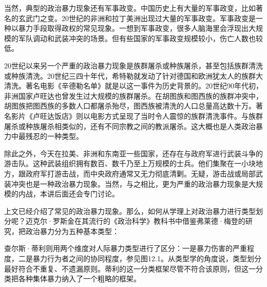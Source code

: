 当然，典型的政治暴力现象还有军事政变。中国历史上有大量的军事政变，比如著名的玄武门之变。20世纪的非洲和拉丁美洲出现过大量的军事政变。军事政变是一种以暴力手段取得政权的常见现象。一想到军事政变，很多人脑海里会浮现出大规模的军队调动和武装冲突的场景。但有些国家的军事政变规模较小，伤亡人数也较低。

20世纪以来另一个严重的政治暴力现象是族群屠杀或种族屠杀，甚至包括族群清洗或种族清洗。20世纪三四十年代，希特勒就发动了针对德国和欧洲犹太人的族群大清洗。著名电影《辛德勒名单》就是以这一事件为历史背景的。20世纪90年代初，非洲国家卢旺达也曾发生过大规模的族群屠杀。在胡图族和图西族的族群冲突中，胡图族把图西族的多数人口都屠杀殆尽，图西族被清洗的人口总量高达数十万。著名影片《卢旺达饭店》则以电影方式呈现了当时令人震惊的族群清洗事件。与族群屠杀或种族屠杀相类似的，还有不同宗教之间的教派屠杀。这大概也是人类政治暴力中最残忍的一种类型。

除此之外，今天在拉美、非洲和东南亚一些国家，还存在与政府军进行武装斗争的游击队。这种武装组织拥有数百、数千乃至上万规模的士兵。他们集聚在一小块地方，跟政府军打游击战，而中央政府通常又无力彻底清剿。无疑，游击战或局部武装冲突也是一种政治暴力现象。当然，与之相比，更为严重的政治暴力现象是大规模的内战，本讲后面还会专门讨论。


上文已经介绍了常见的政治暴力现象。那么，如何从学理上对政治暴力进行类型划分呢？迈克尔·罗斯金在其流行的《政治科学》教科书中借鉴弗莱德·梅登的研究，把政治暴力分为五种基本类型：


查尔斯·蒂利则用两个维度对人际暴力类型进行了区分：一是暴力伤害的严重程度，二是暴力行为者之间的协同程度，参见图12.1。从类型学的角度说，类型划分最好符合不重复、不遗漏原则。蒂利的这一分类框架尽管不符合该原则，但这一分类把各种集体暴力纳入了一个粗略的框架。

